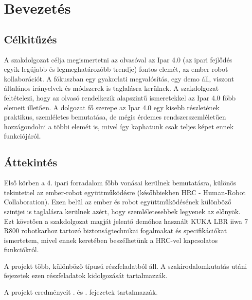 \documentclass[../documentation.tex]{subfiles}
\begin{document}
\section{Bevezetés}
\subsection{Célkitűzés}
A szakdolgozat célja megismertetni az olvasóval az Ipar 4.0 (az ipari fejlődés egyik legújabb és legmeghatározóbb trendje) fontos elemét, az ember-robot kollaborációt. A fókuszban egy gyakorlati megvalósítás, egy demo áll, viszont általános irányelvek és módszerek is taglalásra kerülnek. A szakdolgozat feltételezi, hogy az olvasó rendelkezik alapszintű ismeretekkel az Ipar 4.0 főbb elemeit illetően. A dolgozat fő szerepe az Ipar 4.0 egy kisebb részletének praktikus, szemléletes bemutatása, de mégis érdemes rendszerszemléletűen hozzágondolni a többi elemét is, mivel így kaphatunk csak teljes képet ennek funkciójáról.

\subsection{Áttekintés}
Első körben a 4. ipari forradalom főbb vonásai kerülnek bemutatásra, különös tekintettel az ember-robot együttműködésre (későbbiekben HRC - \foreignlanguage{british}{Human-Robot Collaboration}). Ezen belül az ember és robot együttműködésének különböző szintjei is taglalásra kerülnek azért, hogy szemléletesebbek legyenek az előnyök. Ezt követően a szakdolgozat magját jelentő demóhoz használt KUKA LBR iiwa 7 R800 robotkarhoz tartozó biztonságtechnikai fogalmakat és specifikációkat ismertetem, mivel ennek keretében beszélhetünk a HRC-vel kapcsolatos funkciókról.

A projekt több, különböző típusú részfeladatból áll. A szakirodalomkutatás utáni fejezetek ezen részfeladatok kidolgozását tartalmazzák.

A projekt eredményeit . és . fejezetek tartalmazzák.
\end{document}

